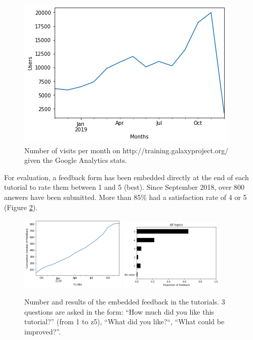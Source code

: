 \documentclass[10pt,letterpaper]{article}
\begin{document}
\begin{figure}[!ht]
	\centering
	\includegraphics[width=\textwidth]{images/visits-per-month.png}
	\caption{Number of visits per month on http://training.galaxyproject.org/ given the Google Analytics stats.
    \label{fig:visits}}
\end{figure}

For evaluation, a feedback form has been embedded directly at the end of each tutorial to rate them between 1 and 5 (best). Since September 2018, over 800 answers have been submitted. More than 85\%  had a satisfaction rate of 4 or 5 (Figure \ref{fig:feedback}).

\begin{figure}[!ht]
	\centering
	\includegraphics[width=0.45\textwidth]{images/feedback.png}
	\includegraphics[width=0.45\textwidth]{images/feedback-scores.png}
	\caption{Number and results of the embedded feedback in the tutorials. 3 questions are asked in the form: ``How much did you like this tutorial?'' (from 1 to z5), ``What did you like?``, ``What could be improved?''.
    \label{fig:feedback}}
\end{figure}
\end{document}
